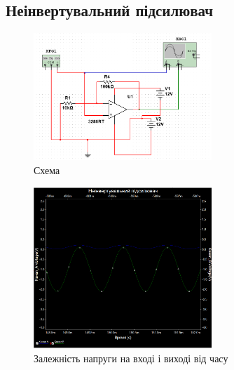 \documentclass[
  ukrainian,
  14pt
]{extreport}
\begin{document}
\subsection{Неінвертувальний підсилювач}
\begin{figure}[H]
    \includegraphics[width=0.6\textwidth]{imgs/2-1.png}
    \centering
    \caption{Схема}
\end{figure}
\begin{figure}[H]
    \includegraphics[width=0.6\textwidth]{imgs/2-2.png}
    \centering
    \caption{Залежність напруги на вході і виході від часу}
\end{figure}
\end{document}
